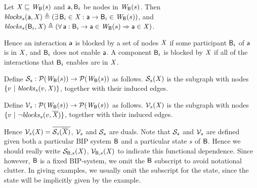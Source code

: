 \begin{definition} \label{defn:blocks} 
Let $\mathit{X} \sqsubseteq \mathit{W}_{\mathsf{B}}({s})$ and $\mathsf{a}, \mathsf{B}_i$ be nodes in $\mathit{W}_{\mathsf{B}}({s})$. Then 
$\mathit{blocks}_{s}(\mathsf{a}, \mathit{X}) \triangleq (\exists\, \mathsf{B}_i \in \mathit{X} : \mathsf{a} \rightarrow \mathsf{B}_i \in \mathit{W}_{\mathsf{B}}({s}))$, and 
$\mathit{blocks}_{s}(\mathsf{B}_i, \mathit{X}) \triangleq (\forall\, \mathsf{a} : \mathsf{B}_i \rightarrow \mathsf{a} \in \mathit{W}_{\mathsf{B}}({s}) \Rightarrow \mathsf{a} \in \mathit{X})$.
\end{definition}
%
Hence an interaction $\mathsf{a}$ is blocked by a set of nodes $\mathit{X}$ if some participant $\mathsf{B}_i$ of 
$\mathsf{a}$ is in $\mathit{X}$, and $\mathsf{B}_i$ does not enable $\mathsf{a}$.
A component $\mathsf{B}_i$ is blocked by $\mathit{X}$ if all of the interactions that $\mathsf{B}_i$ enables are in $\mathit{X}$.


\begin{definition}[$\SFsymb_s$]  \label{defn:scFix} 
Define $\mathcal{S}_s: \mathcal{P}(\mathit{W}_{\mathsf{B}}({s})) \to \mathcal{P}(\mathit{W}_{\mathsf{B}}({s}))$ as follows.
$\mathcal{S}_{s}(\mathit{X})$ is the subgraph with nodes $\{ v ~|~ \mathit{blocks}_{s}(v, \mathit{X})  \}$, together with their induced edges.
\end{definition}

\begin{definition}[$\VFsymb_s$]  \label{defn:violFix}
Define $\mathcal{V}_s: \mathcal{P}(\mathit{W}_{\mathsf{B}}({s})) \to \mathcal{P}(\mathit{W}_{\mathsf{B}}({s}))$ as follows.
$\mathcal{V}_{s}(\mathit{X})$ is the subgraph with nodes
$\{ v ~|~ \neg \mathit{blocks}_{s}(v, \overline{\mathit{\mathit{X}}}) \}$, together with their induced edges.
\end{definition}
%
Hence $\mathcal{V}_{s}(\mathit{X}) = \overline{\mathit{\mathcal{S}_{s}(\overline{\mathit{\mathit{X}}})}}$, \ie $\VFsymb_s$ and $\SFsymb_s$ are duals.
Note that $\SFsymb_s$ and $\VFsymb_s$ are defined given both a particular BIP system 
$\mathsf{B}$ and a particular state $s$ of $\mathsf{B}$. Hence we should really write 
$\mathcal{S}_{\mathsf{B},s}(\mathit{X})$, $\mathcal{V}_{\mathsf{B},s}(\mathit{X})$ to indicate this functional dependence. 
Since however, 
$\mathsf{B}$ is a fixed BIP-system, we omit the $\mathsf{B}$ subscript to avoid notational clutter.
In giving examples, we usually omit the subscript for the state, since the state will be implicitly given by the example.


